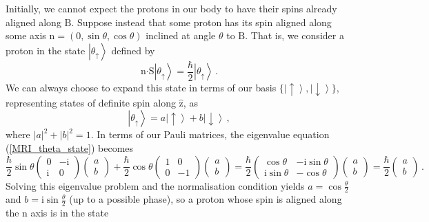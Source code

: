 \documentclass{article}
\theoremstyle{plain}\theoremheaderfont{\normalfont\itshape}\theorembodyfont{\rmfamily}\theoremseparator{.}\newtheorem*{rem}{Remark}\newtheorem*{ex}{Example}\newtheorem*{proof}{Proof}\newtheorem*{altp}{Alternative proof}
\theoremstyle{plain}\theoremheaderfont{\normalfont\bfseries}\theorembodyfont{\rmfamily}\theoremseparator{.}\newtheorem{thm}{Theorem}[section]\newtheorem{lem}[thm]{Lemma}\newtheorem{prop}[thm]{Proposition}\newtheorem*{cor}{Corollary}\newtheorem{defn}[thm]{Definition}\newtheorem{clm}[thm]{Claim}\newtheorem{clminproof}{Claim}
\theoremstyle{break}\theoremheaderfont{\normalfont\itshape}\theorembodyfont{\rmfamily}\theoremseparator{.\medskip}\newtheorem*{proofskip}{Proof}\newtheorem*{exs}{Examples}\newtheorem*{rems}{Remarks}
\theoremstyle{break}\theoremheaderfont{\normalfont\bfseries}\theorembodyfont{\rmfamily}\theoremseparator{.\medskip}\newtheorem{lemskip}[thm]{Lemma}\newtheorem{defnskip}[thm]{Definition}\newtheorem{propskip}[thm]{Proposition}\newtheorem{thmskip}[thm]{Theorem}
\numberwithin{equation}{section}
\newcommand{\ii}{\mathrm{i}}
\newcommand{\ket}[1]{\left| #1 \right\rangle}
\newcommand{\vb}[1]{\bm{\mathrm{#1}}}
\newcommand{\vdot}{\bm{\cdot}}
\newcommand{\abs}[1]{\left| #1 \right|}
\begin{document}
    Initially, we cannot expect the protons in our body to have their spins already aligned along \(\vb{B}\). Suppose instead that some proton has its spin aligned along some axis \(\vb{n}=(0,\sin\theta,\cos\theta)\) inclined at angle \(\theta\) to \(\vb{B}\). That is, we consider a proton in the state \(\ket{\theta_{\uparrow}}\) defined by
    \begin{equation}\label{MRI_theta_state}
        \vb{n}\vdot\vb{S}\ket{\theta_{\uparrow}}=\frac{\hbar}{2}\ket{\theta_{\uparrow}}\,.
    \end{equation}
    We can always choose to expand this state in terms of our basis \(\{\ket{\uparrow},\ket{\downarrow}\}\), representing states of definite spin along \(\hat{\vb{z}}\), as
    \begin{equation}
        \ket{\theta_{\uparrow}}=a\ket{\uparrow}+b\ket{\downarrow}\,,
    \end{equation}
    where \(\abs{a}^2+\abs{b}^2=1\). In terms of our Pauli matrices, the eigenvalue equation (\ref{MRI_theta_state}) becomes
    \begin{equation}
        \frac{\hbar}{2}\sin\theta\begin{pmatrix}
            0 & -\ii \\ \ii & 0
        \end{pmatrix}\begin{pmatrix}
            a \\ b
        \end{pmatrix}+\frac{\hbar}{2}\cos\theta\begin{pmatrix}
            1 & 0 \\ 0 & -1
        \end{pmatrix}\begin{pmatrix}
            a \\ b
        \end{pmatrix}=\frac{\hbar}{2}\begin{pmatrix}
            \cos\theta & -\ii\sin\theta \\
            \ii\sin\theta & -\cos\theta
        \end{pmatrix}\begin{pmatrix}
            a \\ b
        \end{pmatrix}=\frac{\hbar}{2}\begin{pmatrix}
            a \\ b
        \end{pmatrix}\,.
    \end{equation}
    Solving this eigenvalue problem and the normalisation condition yields \(a=\cos\frac{\theta}{2}\) and \(b=\ii\sin\frac{\theta}{2}\) (up to a possible phase), so a proton whose spin is aligned along the \(\vb{n}\) axis is in the state
\end{document}
